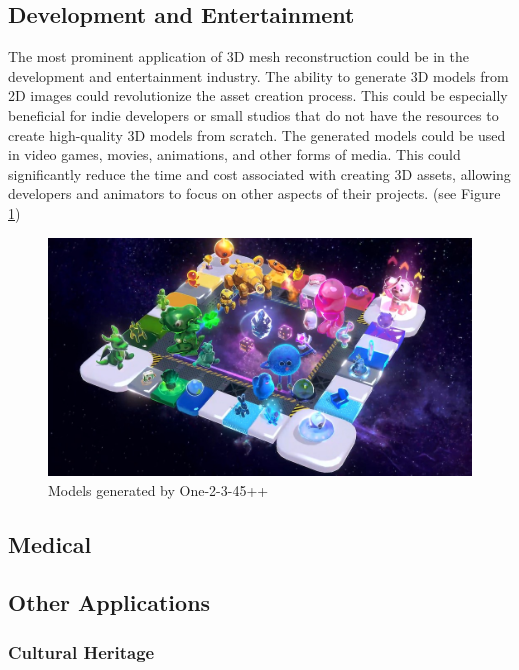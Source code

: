 \subsection{Development and Entertainment}
The most prominent application of 3D mesh reconstruction could be in the development and entertainment industry. The ability to generate 3D models from 2D images could revolutionize the asset creation process.
This could be especially beneficial for indie developers or small studios that do not have the resources to create high-quality 3D models from scratch. The generated models could be used in video games, movies, animations, and other forms of media. This could significantly reduce the time and cost associated with creating 3D assets, allowing developers and animators to focus on other aspects of their projects. (see Figure \ref{fig:one-2-3-4-5-plus-plus-demo})
\begin{figure}
    \centering
    \includegraphics[width=1\linewidth]{images/one-2-3-45++_demo.jpg}
    \caption{Models generated by One-2-3-45++ \autocite{liu_one-2-3-45_2023-1}}
    \label{fig:one-2-3-4-5-plus-plus-demo}
\end{figure}

\subsection{Medical}

\subsection{Other Applications}

\subsubsection{Cultural Heritage}


